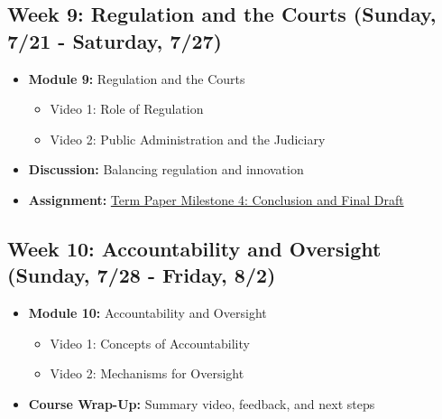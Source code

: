 \documentclass[11pt, letterpaper]{article}
\begin{document}
\subsection*{Week 9: Regulation and the Courts (Sunday, 7/21 - Saturday, 7/27)}
\begin{itemize}
    \item \textbf{Module 9:} Regulation and the Courts
    \begin{itemize}
        \item Video 1: Role of Regulation
        \item Video 2: Public Administration and the Judiciary
    \end{itemize}
    \item \textbf{Discussion:} Balancing regulation and innovation
    \item \textbf{Assignment:} \href{https://us.kritik.io/course/cltwics8d035m146piz0jn5t0/assignment/clwms87ek014pfih46sq1qe3p?resultsPerPage=50&page=1&filterBy=SHOW_ALL&searchString=&sortBy=NAME&sortOrder=1&viewType=Progress}{Term Paper Milestone 4: Conclusion and Final Draft} 
\end{itemize}

\subsection*{Week 10: Accountability and Oversight (Sunday, 7/28 - Friday, 8/2)}
\begin{itemize}
    \item \textbf{Module 10:} Accountability and Oversight
    \begin{itemize}
        \item Video 1: Concepts of Accountability
        \item Video 2: Mechanisms for Oversight
    \end{itemize}
    \item \textbf{Course Wrap-Up:} Summary video, feedback, and next steps
\end{itemize}
\end{document}
